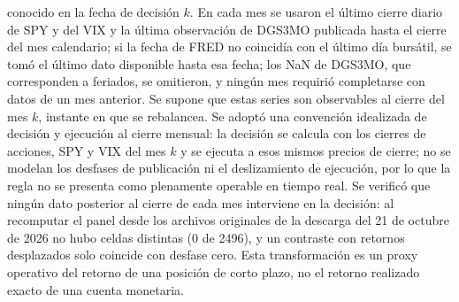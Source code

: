 conocido en la fecha de decisión $k$. En cada mes se usaron el último cierre diario de SPY y del VIX y la última observación de DGS3MO publicada hasta el cierre del mes calendario; si la fecha de FRED no coincidía con el último día bursátil, 
se tomó el último dato disponible hasta esa fecha; los NaN de DGS3MO, que corresponden a feriados, se omitieron, y ningún mes requirió completarse con datos de un mes anterior. Se supone que estas series son observables al cierre del mes $k$, instante en que se rebalancea. Se adoptó una convención idealizada de decisión y ejecución al cierre mensual: la decisión se calcula con los cierres de acciones, SPY y VIX del mes $k$ y se ejecuta a esos mismos precios de cierre; no se modelan los desfases de publicación ni el deslizamiento de ejecución, por lo que la regla no se presenta como plenamente operable en tiempo real. Se verificó que ningún dato posterior al cierre de cada mes interviene en la decisión: al recomputar el panel desde los archivos originales de la descarga del 21 de octubre de 2026 no hubo celdas distintas (0 de 2496), y un contraste con retornos desplazados solo coincide con desfase cero.
 Esta transformación es un proxy
 operativo del retorno de una posición de corto plazo, no el retorno realizado exacto de una cuenta monetaria.

